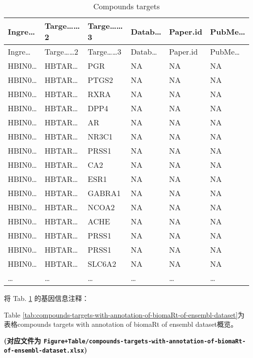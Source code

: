 \documentclass[
]{article}
\begin{document}
\begin{longtable}[]{@{}llllll@{}}
\caption{\label{tab:compounds-targets}Compounds targets}\tabularnewline
\toprule\noalign{}
Ingre\ldots{} & Targe\ldots\ldots2 & Targe\ldots\ldots3 & Datab\ldots{} & Paper.id & PubMe\ldots{} \\
\midrule\noalign{}
\endfirsthead
\toprule\noalign{}
Ingre\ldots{} & Targe\ldots\ldots2 & Targe\ldots\ldots3 & Datab\ldots{} & Paper.id & PubMe\ldots{} \\
\midrule\noalign{}
\endhead
\bottomrule\noalign{}
\endlastfoot
HBIN0\ldots{} & HBTAR\ldots{} & PGR & NA & NA & NA \\
HBIN0\ldots{} & HBTAR\ldots{} & PTGS2 & NA & NA & NA \\
HBIN0\ldots{} & HBTAR\ldots{} & RXRA & NA & NA & NA \\
HBIN0\ldots{} & HBTAR\ldots{} & DPP4 & NA & NA & NA \\
HBIN0\ldots{} & HBTAR\ldots{} & AR & NA & NA & NA \\
HBIN0\ldots{} & HBTAR\ldots{} & NR3C1 & NA & NA & NA \\
HBIN0\ldots{} & HBTAR\ldots{} & PRSS1 & NA & NA & NA \\
HBIN0\ldots{} & HBTAR\ldots{} & CA2 & NA & NA & NA \\
HBIN0\ldots{} & HBTAR\ldots{} & ESR1 & NA & NA & NA \\
HBIN0\ldots{} & HBTAR\ldots{} & GABRA1 & NA & NA & NA \\
HBIN0\ldots{} & HBTAR\ldots{} & NCOA2 & NA & NA & NA \\
HBIN0\ldots{} & HBTAR\ldots{} & ACHE & NA & NA & NA \\
HBIN0\ldots{} & HBTAR\ldots{} & PRSS1 & NA & NA & NA \\
HBIN0\ldots{} & HBTAR\ldots{} & PRSS1 & NA & NA & NA \\
HBIN0\ldots{} & HBTAR\ldots{} & SLC6A2 & NA & NA & NA \\
\ldots{} & \ldots{} & \ldots{} & \ldots{} & \ldots{} & \ldots{} \\
\end{longtable}

将 Tab. \ref{tab:compounds-targets} 的基因信息注释：

Table \ref{tab:compounds-targets-with-annotation-of-biomaRt-of-ensembl-dataset}为表格compounds targets with annotation of biomaRt of ensembl dataset概览。

\textbf{(对应文件为 \texttt{Figure+Table/compounds-targets-with-annotation-of-biomaRt-of-ensembl-dataset.xlsx})}
\end{document}
